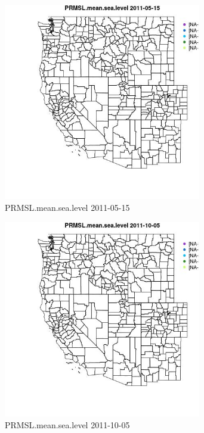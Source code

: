 \begin{figure} 
\centering  
\includegraphics[width=0.77\textwidth]{Code_Outputs/ML_input_report_ML_input_PM25_Step5_part_d_de_duplicated_aves_ML_input_MapObsPRMSLmeansealevel2011-05-15.jpg} 
\caption{\label{fig:ML_input_report_ML_input_PM25_Step5_part_d_de_duplicated_aves_ML_inputMapObsPRMSLmeansealevel2011-05-15}PRMSL.mean.sea.level 2011-05-15} 
\end{figure} 
 

\clearpage 

\begin{figure} 
\centering  
\includegraphics[width=0.77\textwidth]{Code_Outputs/ML_input_report_ML_input_PM25_Step5_part_d_de_duplicated_aves_ML_input_MapObsPRMSLmeansealevel2011-10-05.jpg} 
\caption{\label{fig:ML_input_report_ML_input_PM25_Step5_part_d_de_duplicated_aves_ML_inputMapObsPRMSLmeansealevel2011-10-05}PRMSL.mean.sea.level 2011-10-05} 
\end{figure} 
 

